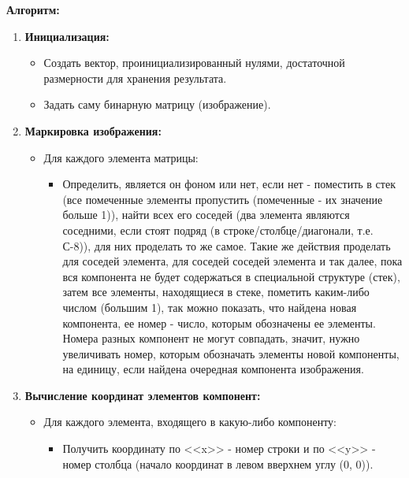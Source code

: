 \documentclass[12pt]{article}
\begin{document}
\textbf{Алгоритм:}

\begin{enumerate}
    \item \textbf{Инициализация:}
        \begin{itemize}
            \item Создать вектор, проинициализированный нулями, достаточной размерности для хранения результата.
            \item Задать саму бинарную матрицу (изображение).
        \end{itemize}

    \item \textbf{Маркировка изображения:}
        \begin{itemize}
            \item Для каждого элемента матрицы:
            \begin{itemize}
                \item Определить, является он фоном или нет, если нет - поместить в стек (все помеченные элементы пропустить (помеченные - их значение больше 1)), найти всех его соседей (два элемента являются соседними, если стоят подряд (в строке/столбце/диагонали, т.е. С-8)), для них проделать то же самое. Такие же действия проделать для соседей элемента, для соседей соседей элемента и так далее, пока вся компонента не будет содержаться в специальной структуре (стек), затем все элементы, находящиеся в стеке, пометить каким-либо числом (большим 1), так можно показать, что найдена новая компонента, ее номер - число, которым обозначены ее элементы. Номера разных компонент не могут совпадать, значит, нужно увеличивать номер, которым обозначать элементы новой компоненты, на единицу, если найдена очередная компонента изображения.
            \end{itemize}
        \end{itemize}

    \item \textbf{Вычисление координат элементов компонент:}
        \begin{itemize}
            \item Для каждого элемента, входящего в какую-либо компоненту:
                \begin{itemize}
                    \item  Получить координату по <<x>> - номер строки и по <<y>> - номер столбца (начало координат в левом вверхнем углу (0, 0)).
                \end{itemize}
         \end{itemize}


\end{enumerate}
\end{document}
